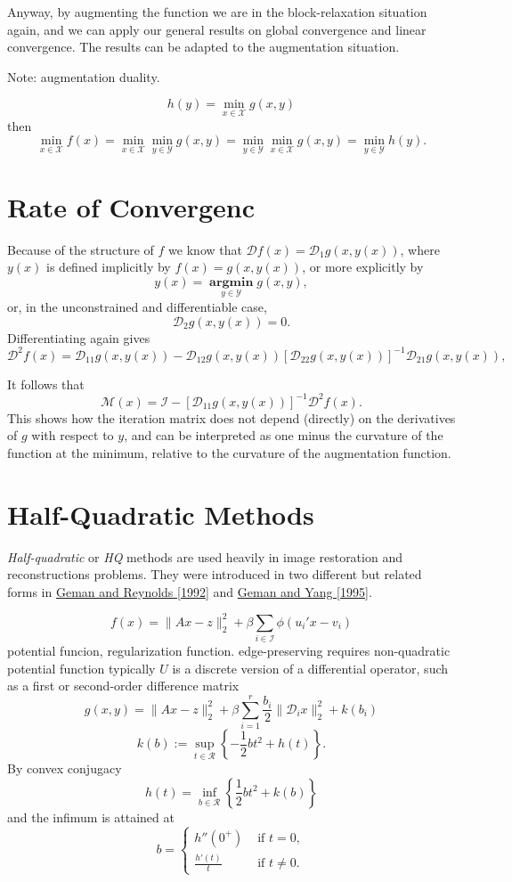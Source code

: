 \documentclass[
  12pt,
]{book}
\begin{document}
Anyway, by augmenting
the function we are in the block-relaxation situation again,
and we can apply our general results on global convergence
and linear convergence. The results can be adapted to the
augmentation situation.

Note: augmentation duality.

\[
h(y)=\min_{x\in\mathcal{X}}g(x,y)
\]
then
\[
\min_{x\in\mathcal{X}}f(x)=\min_{x\in\mathcal{X}}\min_{y\in\mathcal{Y}}g(x,y)=\min_{y\in\mathcal{Y}}\min_{x\in\mathcal{X}}g(x,y)=\min_{y\in\mathcal{Y}}h(y).
\]

\hypertarget{rate-of-convergenc}{%
\section{Rate of Convergenc}\label{rate-of-convergenc}}

Because of the structure of \(f\) we know that \(\mathcal{D}f(x)=\mathcal{D}_1g(x,y(x))\),
where \(y(x)\) is defined implicitly by \(f(x)=g(x,y(x))\), or more explicitly by
\[
y(x)=\mathop{\mathbf{argmin}}\limits_{y\in\mathcal{Y}} g(x,y),
\]
or, in the unconstrained and differentiable case,
\[
\mathcal{D}_2g(x,y(x))=0.
\]
Differentiating again gives
\[
\mathcal{D}^2f(x)=\mathcal{D}_{11}g(x,y(x))-\mathcal{D}_{12}g(x,y(x))
[\mathcal{D}_{22}g(x,y(x))]^{-1}\mathcal{D}_{21}g(x,y(x)),
\]

It follows that
\[
\mathcal{M}(x)=\mathcal{I}-[\mathcal{D}_{11}g(x,y(x))]^{-1}\mathcal{D}^2f(x).
\]
This shows how the iteration matrix does not depend (directly)
on the derivatives of \(g\) with respect to \(y\), and can
be interpreted as one minus the curvature of the function at the minimum, relative to the curvature of the augmentation function.

\hypertarget{half-quadratic-methods}{%
\section{Half-Quadratic Methods}\label{half-quadratic-methods}}

\emph{Half-quadratic} or \emph{HQ} methods are used heavily in image restoration and reconstructions problems. They were introduced in two different but related forms in \href{}{Geman and Reynolds {[}1992{]}} and \href{}{Geman and Yang {[}1995{]}}.

\[
f(x)=\|Ax-z\|_2^2+\beta\sum_{i\in\mathcal{I}}\phi(u_i'x-v_i)
\]
potential funcion, regularization function. edge-preserving requires non-quadratic potential function typically \(U\) is a discrete version of a differential operator, such as a first or second-order difference matrix
\[
g(x,y)=\|Ax-z\|_2^2+\beta\sum_{i=1}^r\frac{b_i}{2}\|\mathcal{D}_ix\|_2^2+k(b_i)
\]
\[
k(b):=\sup_{t\in\mathcal{R}}\left\{-\frac12bt^2+h(t)\right\}.
\]
By convex conjugacy
\[
h(t)=\inf_{b\in\mathcal{R}}\left\{\frac12bt^2+k(b)\right\}
\]
and the infimum is attained at
\[
b=\begin{cases}h''(0^+)&\text{ if }t=0,\\
\frac{h'(t)}{t}&\text{ if }t\not= 0.
\end{cases}
\]
\end{document}
